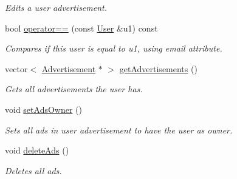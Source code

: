\begin{DoxyCompactItemize}
\begin{DoxyCompactList}\small\item\em Edits a user advertisement. \end{DoxyCompactList}\item 
bool \hyperlink{class_user_aa141a81fd5094fea55f53126a94a0342}{operator==} (const \hyperlink{class_user}{User} \&u1) const 
\begin{DoxyCompactList}\small\item\em Compares if this user is equal to u1, using email attribute. \end{DoxyCompactList}\item 
vector$<$ \hyperlink{class_advertisement}{Advertisement} $\ast$ $>$ \hyperlink{class_user_af0392c9bec07c5dae9f267437189ab3b}{get\+Advertisements} ()
\begin{DoxyCompactList}\small\item\em Gets all advertisements the user has. \end{DoxyCompactList}\item 
\hypertarget{class_user_adcc858fe44180cee73bc834632bfdb25}{}void \hyperlink{class_user_adcc858fe44180cee73bc834632bfdb25}{set\+Ads\+Owner} ()\label{class_user_adcc858fe44180cee73bc834632bfdb25}

\begin{DoxyCompactList}\small\item\em Sets all ads in user advertisement to have the user as owner. \end{DoxyCompactList}\item 
\hypertarget{class_user_a9e9f5d5cc0627f130ff2739ea57d3366}{}void \hyperlink{class_user_a9e9f5d5cc0627f130ff2739ea57d3366}{delete\+Ads} ()\label{class_user_a9e9f5d5cc0627f130ff2739ea57d3366}

\begin{DoxyCompactList}\small\item\em Deletes all ads. \end{DoxyCompactList}\end{DoxyCompactItemize}

